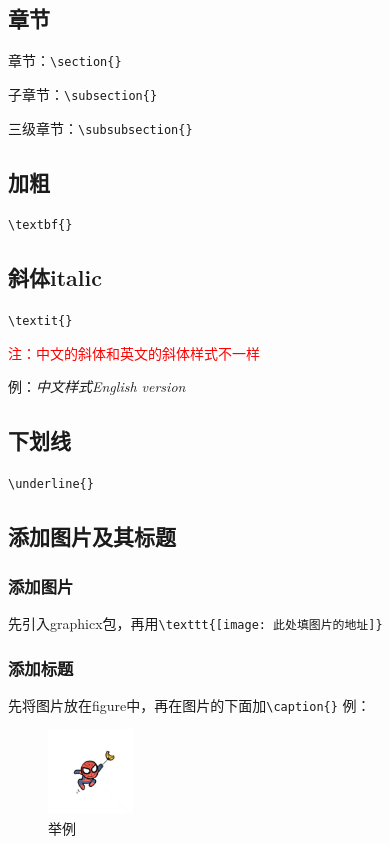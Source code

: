 \documentclass[UTF8,a4paper]{ctexart}
\begin{document}
\subsection{章节}
章节：\verb|\section{}|

子章节：\verb|\subsection{}|

三级章节：\verb|\subsubsection{}|

\subsection{加粗}\verb|\textbf{}|
\subsection{斜体italic}
\verb|\textit{}|  
 
\textcolor{red}{注：中文的斜体和英文的斜体样式不一样}

例：\textit{中文样式}\qquad\textit{English version}

\subsection{下划线}\verb|\underline{}|

\subsection{添加图片及其标题} 
\subsubsection{添加图片} 
先引入graphicx包，再用\verb|\texttt{[image: 此处填图片的地址]}| 
\subsubsection{添加标题} 
先将图片放在figure中，再在图片的下面加\verb|\caption{}|
例：

\begin{figure}[H]
    \centering
    \includegraphics[width=0.2\textwidth]{photo.jpg}
    \caption{举例}
\end{figure}
\end{document}
